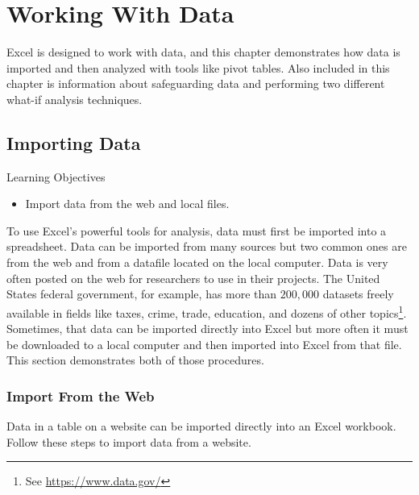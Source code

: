 \chapter{Working With Data}\label{ch07:data}

Excel is designed to work with data, and this chapter demonstrates how data is imported and then analyzed with tools like pivot tables. Also included in this chapter is information about safeguarding data and performing two different what-if analysis techniques. 

\section{Importing Data}

\begin{center}
	\begin{objbox}{Learning Objectives}
		\begin{itemize}
			\setlength{\itemsep}{0pt}
			\setlength{\parskip}{0pt}
			\setlength{\parsep}{0pt}
			
			\item Import data from the web and local files.

		\end{itemize}
	\end{objbox}
\end{center}

To use Excel's powerful tools for analysis, data must first be imported into a spreadsheet. Data can be imported from many sources but two common ones are from the web and from a datafile located on the local computer. Data is very often posted on the web for researchers to use in their projects. The United States federal government, for example, has more than $ 200,000 $ datasets freely available in fields like taxes, crime, trade, education, and dozens of other topics\footnote{See \url{https://www.data.gov/}}. Sometimes, that data can be imported directly into Excel but more often it must be downloaded to a local computer and then imported into Excel from that file. This section demonstrates both of those procedures.

\subsection{Import From the Web}

Data in a table on a website can be imported directly into an Excel workbook. Follow these steps to import data from a website.

